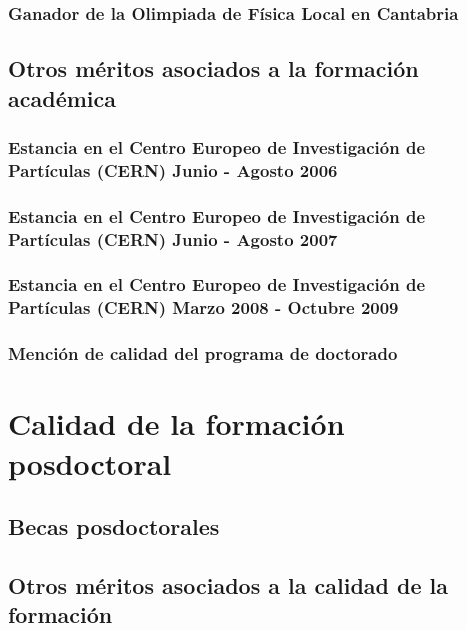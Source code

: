 \documentclass[a4paper, 11pt, twoside, openright]{report}
\begin{document}
\subsubsection{Ganador de la Olimpiada de Física Local en Cantabria}


\subsection{Otros méritos asociados a la formación académica}

\subsubsection{Estancia en el Centro Europeo de Investigación de Partículas (CERN) Junio - Agosto 2006}


\subsubsection{Estancia en el Centro Europeo de Investigación de Partículas (CERN) Junio - Agosto 2007}


\subsubsection{Estancia en el Centro Europeo de Investigación de Partículas (CERN) Marzo 2008 - Octubre 2009}


\subsubsection{Mención de calidad del programa de doctorado}


\section{Calidad de la formación posdoctoral}

\subsection{Becas posdoctorales}

\subsection{Otros méritos asociados a la calidad de la formación}
\end{document}
